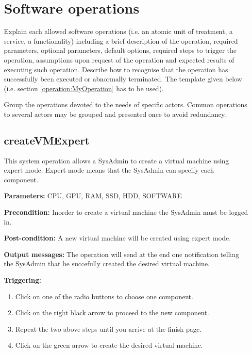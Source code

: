 \chapter{Software operations}
\label{chap:soptware_operations}


Explain each allowed software operations (i.e. an atomic unit of treatment, a service, a functionality) including a brief description of the operation, required parameters, optional parameters, default options, required steps to trigger the operation, assumptions upon request of the operation and expected results of executing such operation.
Describe how to recognise that the operation has successfully been executed or
abnormally terminated. The template given below (i.e. section \ref{operation:MyOperation} has to be used).

Group the operations devoted to the needs of specific actors. Common
operations to several actors may be grouped and presented once to avoid redundancy.


\section{createVMExpert}
\label{operation:createVMExpert}
This system operation allows a SysAdmin to create a virtual machine using expert
mode. Expert mode means that the SysAdmin can specify each component.

\begin{description}

\item \textbf{Parameters:} CPU, GPU, RAM, SSD, HDD, SOFTWARE
\item \textbf{Precondition:} Inorder to create a virtual machine the SysAdmin must
be logged in.
\item \textbf{Post-condition:} A new virtual machine will be created using
expert mode.
\item \textbf{Output messages:} The operation will send at the end one
notification telling the SysAdmin that he succefully created the desired virtual
machine.

\item \textbf{Triggering:}
\begin{enumerate}
\item Click on one of the radio buttons to choose one component.
\item Click on the right black arrow to proceed to the new component.
\item Repeat the two above steps until you arrive at the finish page.
\item Click on the green arrow to create the desired virtual machine.
\end{enumerate}

 
\end{description}

